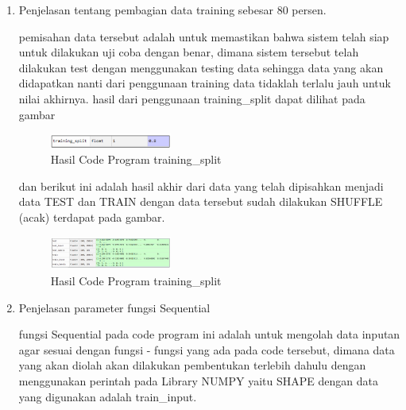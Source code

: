 \begin{enumerate}
            \item Penjelasan tentang pembagian data training sebesar 80 persen.
            
            
            
            \subitem pemisahan data tersebut adalah untuk memastikan bahwa sistem telah siap untuk dilakukan uji coba dengan benar, dimana sistem tersebut telah dilakukan test dengan menggunakan testing data sehingga data yang akan didapatkan nanti dari penggunaan training data tidaklah terlalu jauh untuk nilai akhirnya. hasil dari penggunaan training\_split dapat dilihat pada gambar 
            
            \begin{figure}[H]
                \includegraphics[width=4cm]{figures/1174009/chapter6/4.png}
                \centering
                  \caption{Hasil Code Program training\_split}
            \end{figure}
            
            \subitem dan berikut ini adalah hasil akhir dari data yang telah dipisahkan menjadi data TEST dan TRAIN dengan data tersebut sudah dilakukan SHUFFLE (acak) terdapat pada gambar.
            
            \begin{figure}[H]
                \includegraphics[width=4cm]{figures/1174009/chapter6/5.png}
                \centering
                  \caption{Hasil Code Program training\_split}
            \end{figure}
            
            \item Penjelasan parameter fungsi Sequential
            
            
            
            \subitem fungsi Sequential pada code program ini adalah untuk mengolah data inputan agar sesuai dengan fungsi - fungsi yang ada pada code tersebut, dimana data yang akan diolah akan dilakukan pembentukan terlebih dahulu dengan menggunakan perintah pada Library NUMPY yaitu SHAPE dengan data yang digunakan adalah train\_input.
            

\end{enumerate}
